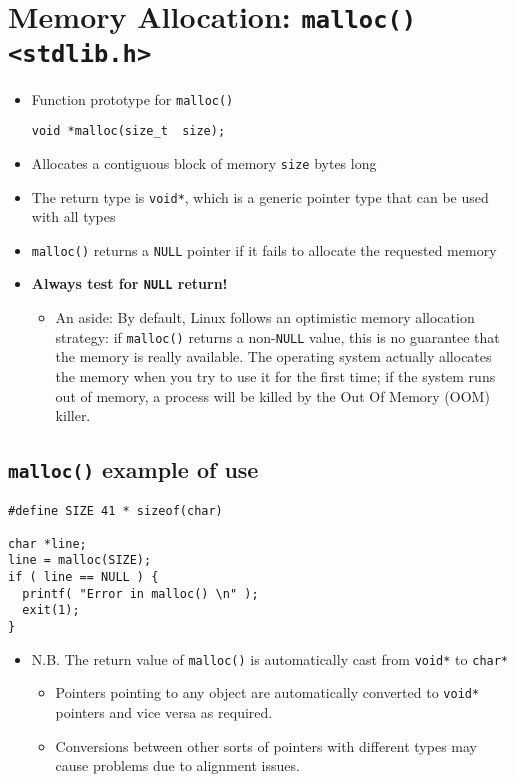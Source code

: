 \documentclass{article}
\begin{document}
\section{Memory Allocation: \texttt{malloc() <stdlib.h>}}
\begin{itemize}
\item Function prototype for \verb!malloc()!
\begin{verbatim}
void *malloc(size_t  size);
\end{verbatim}
\item Allocates a contiguous block of memory \verb!size! bytes long
\item The return type is \verb!void*!, which is a generic pointer type that can be used with all types
\item \verb!malloc()! returns a \verb!NULL! pointer if it fails to allocate the requested memory
\item \textbf{Always test for \texttt{NULL} return!}
\begin{itemize}
\item An aside: By default, Linux follows an optimistic memory allocation strategy: if \verb!malloc()! returns a non-\verb!NULL! value, this is no guarantee that the memory is really available.
The operating system actually allocates the memory when you try to use it for the first time; if the system runs out of memory, a process will be killed by the Out Of Memory (OOM) killer.
\end{itemize}
\end{itemize}



\subsection{\texttt{malloc()} example of use}
\begin{verbatim}
#define SIZE 41 * sizeof(char)

char *line; 
line = malloc(SIZE);
if ( line == NULL ) {
  printf( "Error in malloc() \n" );
  exit(1);
}
\end{verbatim}

\begin{itemize}
\item N.B. The return value of \verb!malloc()! is automatically cast from \verb!void*! to \verb!char*!
\begin{itemize}
\item Pointers pointing to any object are automatically converted to \verb!void*! pointers and vice versa as required.
\item Conversions between other sorts of pointers with different types may cause problems due to alignment issues.
\end{itemize}
\end{itemize}
\end{document}
